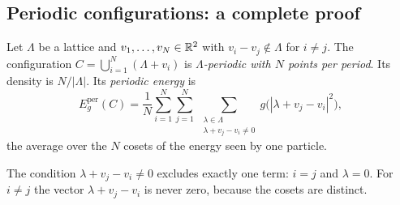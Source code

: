 \subsection{Periodic configurations: a complete proof}

\begin{definition}\label{def:periodic}
Let $\Lambda$ be a lattice and $v_1,\dots,v_N\in\mathbb{R}^2$ with $v_i-v_j\notin\Lambda$ for $i\ne j$. The configuration
$C=\bigcup_{i=1}^N(\Lambda+v_i)$ is \emph{$\Lambda$-periodic with $N$ points per period}. Its density is
$N/|\Lambda|$. Its \emph{periodic energy} is
\[
  E^{\mathrm{per}}_g(C)=\frac1N\sum_{i=1}^N\sum_{j=1}^N\ \sum_{\substack{\lambda\in\Lambda\\ \lambda+v_j-v_i\ne0}}
  g\bigl(|\lambda+v_j-v_i|^2\bigr),
\]
the average over the $N$ cosets of the energy seen by one particle.
\end{definition}

The condition $\lambda+v_j-v_i\ne0$ excludes exactly one term: $i=j$ and $\lambda=0$. For $i\ne j$ the vector
$\lambda+v_j-v_i$ is never zero, because the cosets are distinct.

